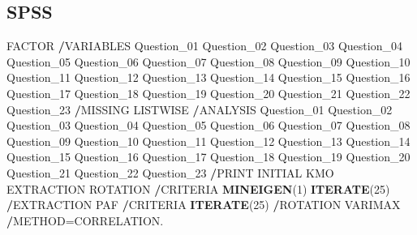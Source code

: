 \documentclass[
]{book}
\newenvironment{Shaded}{\begin{snugshade}}{\end{snugshade}}
\newcommand{\DecValTok}[1]{\textcolor[rgb]{0.00,0.00,0.81}{#1}}
\newcommand{\KeywordTok}[1]{\textcolor[rgb]{0.13,0.29,0.53}{\textbf{#1}}}
\newcommand{\NormalTok}[1]{#1}
\newcommand{\OperatorTok}[1]{\textcolor[rgb]{0.81,0.36,0.00}{\textbf{#1}}}
\begin{document}
\hypertarget{spss-1}{%
\subsection{SPSS}\label{spss-1}}

\begin{Shaded}
\begin{Highlighting}[]
\NormalTok{FACTOR}
  \OperatorTok{/}\NormalTok{VARIABLES Question_}\DecValTok{01}\NormalTok{ Question_}\DecValTok{02}\NormalTok{ Question_}\DecValTok{03}\NormalTok{ Question_}\DecValTok{04}\NormalTok{ Question_}\DecValTok{05}\NormalTok{ Question_}\DecValTok{06}\NormalTok{ Question_}\DecValTok{07} 
\NormalTok{    Question_}\DecValTok{08}\NormalTok{ Question_}\DecValTok{09}\NormalTok{ Question_}\DecValTok{10}\NormalTok{ Question_}\DecValTok{11}\NormalTok{ Question_}\DecValTok{12}\NormalTok{ Question_}\DecValTok{13}\NormalTok{ Question_}\DecValTok{14}\NormalTok{ Question_}\DecValTok{15} 
\NormalTok{    Question_}\DecValTok{16}\NormalTok{ Question_}\DecValTok{17}\NormalTok{ Question_}\DecValTok{18}\NormalTok{ Question_}\DecValTok{19}\NormalTok{ Question_}\DecValTok{20}\NormalTok{ Question_}\DecValTok{21}\NormalTok{ Question_}\DecValTok{22}\NormalTok{ Question_}\DecValTok{23}
  \OperatorTok{/}\NormalTok{MISSING LISTWISE }
  \OperatorTok{/}\NormalTok{ANALYSIS Question_}\DecValTok{01}\NormalTok{ Question_}\DecValTok{02}\NormalTok{ Question_}\DecValTok{03}\NormalTok{ Question_}\DecValTok{04}\NormalTok{ Question_}\DecValTok{05}\NormalTok{ Question_}\DecValTok{06}\NormalTok{ Question_}\DecValTok{07} 
\NormalTok{    Question_}\DecValTok{08}\NormalTok{ Question_}\DecValTok{09}\NormalTok{ Question_}\DecValTok{10}\NormalTok{ Question_}\DecValTok{11}\NormalTok{ Question_}\DecValTok{12}\NormalTok{ Question_}\DecValTok{13}\NormalTok{ Question_}\DecValTok{14}\NormalTok{ Question_}\DecValTok{15} 
\NormalTok{    Question_}\DecValTok{16}\NormalTok{ Question_}\DecValTok{17}\NormalTok{ Question_}\DecValTok{18}\NormalTok{ Question_}\DecValTok{19}\NormalTok{ Question_}\DecValTok{20}\NormalTok{ Question_}\DecValTok{21}\NormalTok{ Question_}\DecValTok{22}\NormalTok{ Question_}\DecValTok{23}
  \OperatorTok{/}\NormalTok{PRINT INITIAL KMO EXTRACTION ROTATION}
  \OperatorTok{/}\NormalTok{CRITERIA }\KeywordTok{MINEIGEN}\NormalTok{(}\DecValTok{1}\NormalTok{) }\KeywordTok{ITERATE}\NormalTok{(}\DecValTok{25}\NormalTok{)}
  \OperatorTok{/}\NormalTok{EXTRACTION PAF}
  \OperatorTok{/}\NormalTok{CRITERIA }\KeywordTok{ITERATE}\NormalTok{(}\DecValTok{25}\NormalTok{)}
  \OperatorTok{/}\NormalTok{ROTATION VARIMAX}
  \OperatorTok{/}\NormalTok{METHOD=CORRELATION.}
\end{Highlighting}
\end{Shaded}
\end{document}
